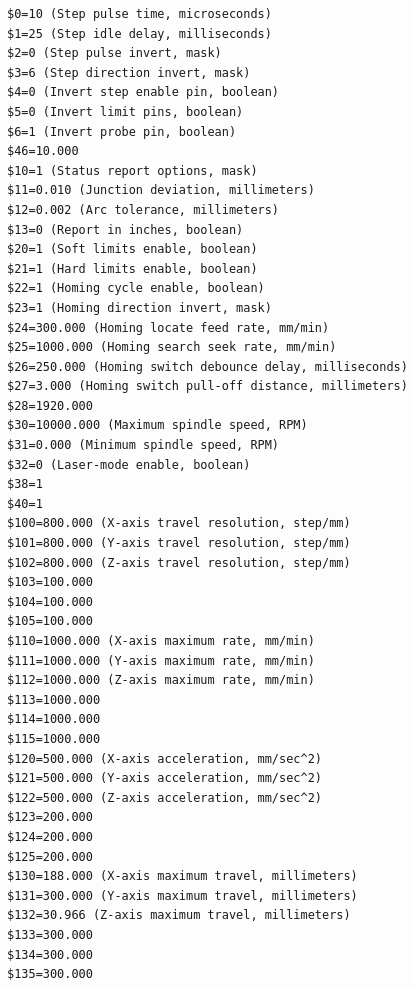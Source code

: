 \documentclass[11pt, openright]{book}
\begin{document}
\footnotesize
          \begin{lstlisting}
$0=10 (Step pulse time, microseconds)
$1=25 (Step idle delay, milliseconds)
$2=0 (Step pulse invert, mask)
$3=6 (Step direction invert, mask)
$4=0 (Invert step enable pin, boolean)
$5=0 (Invert limit pins, boolean)
$6=1 (Invert probe pin, boolean)
$46=10.000
$10=1 (Status report options, mask)
$11=0.010 (Junction deviation, millimeters)
$12=0.002 (Arc tolerance, millimeters)
$13=0 (Report in inches, boolean)
$20=1 (Soft limits enable, boolean)
$21=1 (Hard limits enable, boolean)
$22=1 (Homing cycle enable, boolean)
$23=1 (Homing direction invert, mask)
$24=300.000 (Homing locate feed rate, mm/min)
$25=1000.000 (Homing search seek rate, mm/min)
$26=250.000 (Homing switch debounce delay, milliseconds)
$27=3.000 (Homing switch pull-off distance, millimeters)
$28=1920.000
$30=10000.000 (Maximum spindle speed, RPM)
$31=0.000 (Minimum spindle speed, RPM)
$32=0 (Laser-mode enable, boolean)
$38=1
$40=1
$100=800.000 (X-axis travel resolution, step/mm)
$101=800.000 (Y-axis travel resolution, step/mm)
$102=800.000 (Z-axis travel resolution, step/mm)
$103=100.000
$104=100.000
$105=100.000
$110=1000.000 (X-axis maximum rate, mm/min)
$111=1000.000 (Y-axis maximum rate, mm/min)
$112=1000.000 (Z-axis maximum rate, mm/min)
$113=1000.000
$114=1000.000
$115=1000.000
$120=500.000 (X-axis acceleration, mm/sec^2)
$121=500.000 (Y-axis acceleration, mm/sec^2)
$122=500.000 (Z-axis acceleration, mm/sec^2)
$123=200.000
$124=200.000
$125=200.000
$130=188.000 (X-axis maximum travel, millimeters)
$131=300.000 (Y-axis maximum travel, millimeters)
$132=30.966 (Z-axis maximum travel, millimeters)
$133=300.000
$134=300.000
$135=300.000
         \end{lstlisting}




        




















    
\end{document}
